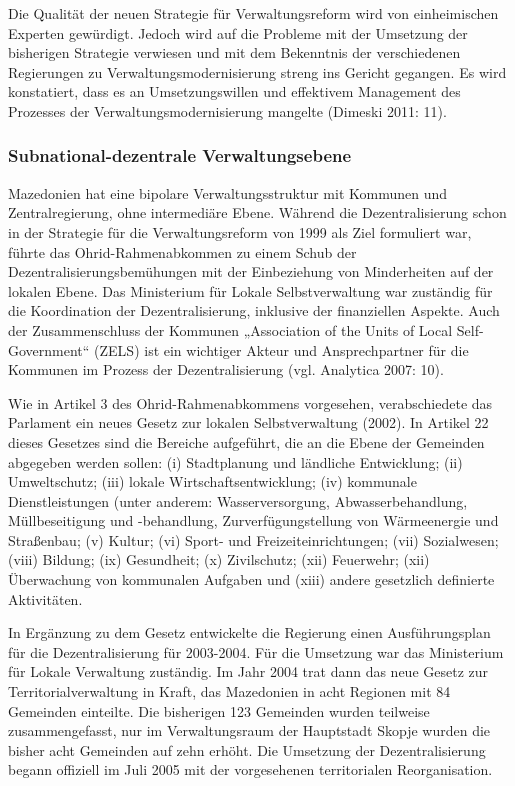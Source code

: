 Die Qualität der neuen Strategie für Verwaltungsreform wird von einheimischen Experten gewürdigt. Jedoch wird auf die Probleme mit der Umsetzung der bisherigen Strategie verwiesen und mit dem Bekenntnis der verschiedenen Regierungen zu Verwaltungsmodernisierung streng ins Gericht gegangen. Es wird konstatiert, dass es an Umsetzungswillen und effektivem Management des Prozesses der Verwaltungsmodernisierung mangelte (Dimeski 2011: 11).

\subsubsection{Subnational-dezentrale Verwaltungsebene}
Mazedonien hat eine bipolare Verwaltungsstruktur mit Kommunen und Zentralregierung, ohne intermediäre Ebene. Während die Dezentralisierung schon in der Strategie für die Verwaltungsreform von 1999 als Ziel formuliert war, führte das Ohrid-Rahmenabkommen zu einem Schub der Dezentralisierungsbemühungen mit der Einbeziehung von Minderheiten auf der lokalen Ebene. Das Ministerium für Lokale Selbstverwaltung war zuständig für die Koordination der Dezentralisierung, inklusive der finanziellen Aspekte. Auch der Zusammenschluss der Kommunen „Association of the Units of Local Self-Government“ (ZELS) ist ein wichtiger Akteur und Ansprechpartner für die Kommunen im Prozess der Dezentralisierung (vgl. Analytica 2007: 10).\par
Wie in Artikel 3 des Ohrid-Rahmenabkommens vorgesehen, verabschiedete das Parlament ein neues Gesetz zur lokalen Selbstverwaltung (2002). In Artikel 22 dieses Gesetzes sind die Bereiche aufgeführt, die an die Ebene der Gemeinden abgegeben werden sollen: (i) Stadtplanung und ländliche Entwicklung; (ii) Umweltschutz; (iii) lokale Wirtschaftsentwicklung; (iv) kommunale Dienstleistungen (unter anderem: Wasserversorgung, Abwasserbehandlung, Müllbeseitigung und -behandlung, Zurverfügungstellung von Wärmeenergie und Straßenbau; (v) Kultur; (vi) Sport- und Freizeiteinrichtungen; (vii) Sozialwesen; (viii) Bildung; (ix) Gesundheit; (x) Zivilschutz; (xii) Feuerwehr; (xii) Überwachung von kommunalen Aufgaben und (xiii) andere gesetzlich definierte Aktivitäten.\par
In Ergänzung zu dem Gesetz entwickelte die Regierung einen Ausführungsplan für die Dezentralisierung für 2003-2004. Für die Umsetzung war das Ministerium für Lokale Verwaltung zuständig. Im Jahr 2004 trat dann das neue Gesetz zur Territorialverwaltung in Kraft, das Mazedonien in acht Regionen mit 84 Gemeinden einteilte. Die bisherigen 123 Gemeinden wurden teilweise zusammengefasst, nur im Verwaltungsraum der Hauptstadt Skopje wurden die bisher acht Gemeinden auf zehn erhöht. Die Umsetzung der Dezentralisierung begann offiziell im Juli 2005 mit der vorgesehenen territorialen Reorganisation. \par
